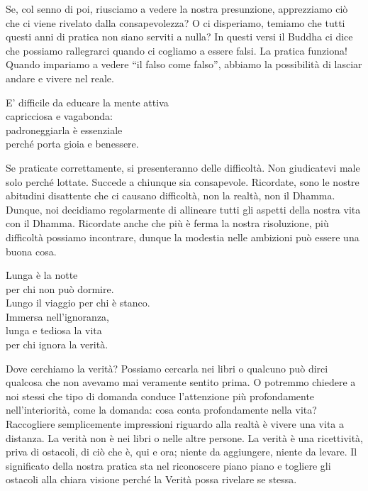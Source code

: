 \begin{dhpRefl}
Se, col senno di poi, riusciamo a vedere la nostra presunzione, apprezziamo ci\`{o} che ci viene rivelato dalla consapevolezza? O ci disperiamo, temiamo che tutti questi anni di pratica non siano serviti a nulla? In questi versi il Buddha ci dice che possiamo rallegrarci quando ci cogliamo a essere falsi. La pratica funziona! Quando impariamo a vedere ``il falso come falso'', abbiamo la possibilit\`{a} di lasciar andare e vivere nel reale.
\end{dhpRefl}


\begin{dhpVerse}{35}
\label{dhp-35}
E' difficile da educare la mente attiva\\
capricciosa e vagabonda:\\
padroneggiarla \`{e} essenziale\\
perch\'{e} porta gioia e benessere.
\end{dhpVerse}

\begin{dhpRefl}
Se praticate correttamente, si presenteranno delle difficolt\`{a}. Non giudicatevi male solo perch\'{e} lottate. Succede a chiunque sia consapevole. Ricordate, sono le nostre abitudini disattente che ci causano difficolt\`{a}, non la realt\`{a}, non il Dhamma. Dunque, noi decidiamo regolarmente di allineare tutti gli aspetti della nostra vita con il Dhamma. Ricordate anche che più \`{e} ferma la nostra risoluzione, più difficolt\`{a} possiamo incontrare, dunque la modestia nelle ambizioni pu\`{o} essere una buona cosa.
\end{dhpRefl}


\begin{dhpVerse}{60}
\label{dhp-60}
Lunga \`{e} la notte\\
per chi non pu\`{o} dormire.\\Lungo il viaggio per chi \`{e} stanco.\\
Immersa nell'ignoranza,\\
lunga e tediosa la vita\\
per chi ignora la verit\`{a}.
\end{dhpVerse}

\begin{dhpRefl}
Dove cerchiamo la verit\`{a}? Possiamo cercarla nei libri o qualcuno pu\`{o} dirci qualcosa che non avevamo mai veramente sentito prima. O potremmo chiedere a noi stessi che tipo di domanda conduce l'attenzione più profondamente nell'interiorit\`{a}, come la domanda: cosa conta profondamente nella vita? Raccogliere semplicemente impressioni riguardo alla realt\`{a} \`{e} vivere una vita a distanza. La verit\`{a} non \`{e} nei libri o nelle altre persone. La verit\`{a} \`{e} una ricettivit\`{a}, priva di ostacoli, di ci\`{o} che \`{e}, qui e ora; niente da aggiungere, niente da levare. Il significato della nostra pratica sta nel riconoscere piano piano e togliere gli ostacoli alla chiara visione perch\'{e} la Verit\`{a} possa rivelare se stessa.
\end{dhpRefl}


